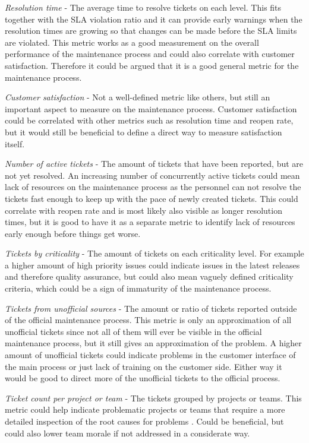 \emph{Resolution time} - The average time to resolve tickets on each level. This fits together with the SLA violation ratio and it can provide early warnings when
the resolution times are growing so that changes can be made before the SLA limits are violated. This metric works as a good measurement on the overall performance of the
maintenance process and could also correlate with customer satisfaction. Therefore it could be argued that it is a good general metric for the maintenance process. \citep{Livy2017}

\emph{Customer satisfaction} - Not a well-defined metric like others, but still an important aspect to measure on the maintenance process. Customer satisfaction could be
correlated with other metrics such as resolution time and reopen rate, but it would still be beneficial to define a direct way to measure satisfaction itself. \citep{Livy2017}

\emph{Number of active tickets} - The amount of tickets that have been reported, but are not yet resolved. An increasing number of concurrently active tickets could mean
lack of resources on the maintenance process as the personnel can not resolve the tickets fast enough to keep up with the pace of newly created tickets. This could correlate with
reopen rate and is most likely also visible as longer resolution times, but it is good to have it as a separate metric to identify lack of resources early enough
before things get worse. \citep{Livy2017}

\emph{Tickets by criticality} - The amount of tickets on each criticality level. For example a higher amount of high priority issues could indicate issues in the latest releases and
therefore quality assurance, but could also mean vaguely defined criticality criteria, which could be a sign of immaturity of the maintenance process. \citep{Livy2017}

\emph{Tickets from unofficial sources} - The amount or ratio of tickets reported outside of the official maintenance process. This metric is only an approximation of all unofficial
tickets since not all of them will ever be visible in the official maintenance process, but it still gives an approximation of the problem. A higher amount of unofficial tickets
could indicate problems in the customer interface of the main process or just lack of training on the customer side. Either way it would be good to direct more of the unofficial
tickets to the official process. \citep{Livy2017}

\emph{Ticket count per project or team} - The tickets grouped by projects or teams. This metric could help indicate problematic projects or teams that require a more detailed
inspection of the root causes for problems \citep{Livy2017}. Could be beneficial, but could also lower team morale if not addressed in a considerate way.

